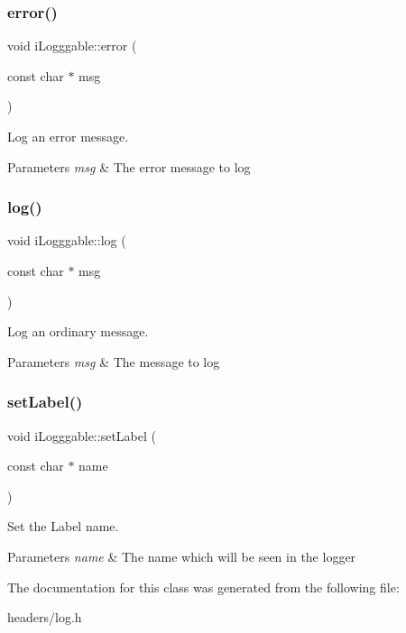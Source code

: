 \subsubsection{error()}
{\footnotesize\ttfamily void i\+Logggable\+::error (\begin{DoxyParamCaption}\item[{const char $\ast$}]{msg }\end{DoxyParamCaption})\hspace{0.3cm}{\ttfamily [inline]}}



Log an error message. 


\begin{DoxyParams}{Parameters}
{\em msg} & The error message to log \\
\hline
\end{DoxyParams}
\mbox{\label{classi_logggable_abd81f07c9bacd1d223f6bf8d50c02e64}} 
\subsubsection{log()}
{\footnotesize\ttfamily void i\+Logggable\+::log (\begin{DoxyParamCaption}\item[{const char $\ast$}]{msg }\end{DoxyParamCaption})\hspace{0.3cm}{\ttfamily [inline]}}



Log an ordinary message. 


\begin{DoxyParams}{Parameters}
{\em msg} & The message to log \\
\hline
\end{DoxyParams}
\mbox{\label{classi_logggable_ae963201357bd04cbdddd92691816c8d0}} 
\subsubsection{set\+Label()}
{\footnotesize\ttfamily void i\+Logggable\+::set\+Label (\begin{DoxyParamCaption}\item[{const char $\ast$}]{name }\end{DoxyParamCaption})\hspace{0.3cm}{\ttfamily [inline]}}



Set the Label name. 


\begin{DoxyParams}{Parameters}
{\em name} & The name which will be seen in the logger \\
\hline
\end{DoxyParams}


The documentation for this class was generated from the following file\+:\begin{DoxyCompactItemize}
\item 
headers/log.\+h\end{DoxyCompactItemize}
